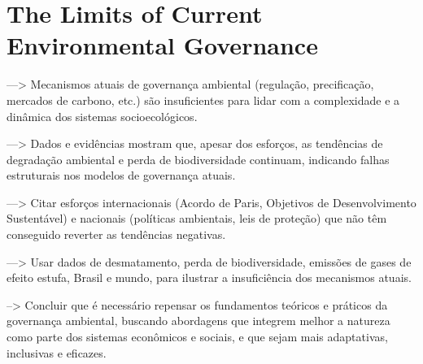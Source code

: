 \section{The Limits of Current Environmental Governance}

---> Mecanismos atuais de governança ambiental (regulação, precificação, mercados de carbono, etc.) são insuficientes para lidar com a complexidade e a dinâmica dos sistemas socioecológicos.

---> Dados e evidências mostram que, apesar dos esforços, as tendências de degradação ambiental e perda de biodiversidade continuam, indicando falhas estruturais nos modelos de governança atuais.

---> Citar esforços internacionais (Acordo de Paris, Objetivos de Desenvolvimento Sustentável) e nacionais (políticas ambientais, leis de proteção) que não têm conseguido reverter as tendências negativas.

---> Usar dados de desmatamento, perda de biodiversidade, emissões de gases de efeito estufa, Brasil e mundo, para ilustrar a insuficiência dos mecanismos atuais.

--> Concluir que é necessário repensar os fundamentos teóricos e práticos da governança ambiental, buscando abordagens que integrem melhor a natureza como parte dos sistemas econômicos e sociais, e que sejam mais adaptativas, inclusivas e eficazes.



